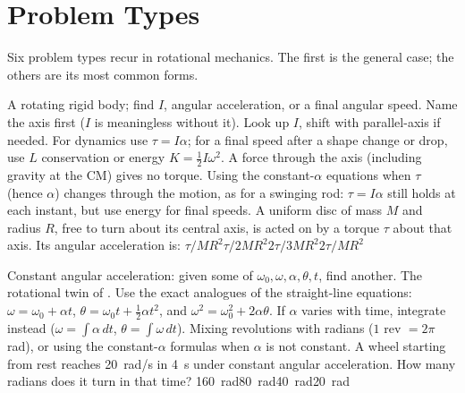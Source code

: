 \section{Problem Types}\label{sec:types14}
Six problem types recur in rotational mechanics. The first is the general case; the others are its most
common forms.

{A rotating rigid body; find $I$, angular acceleration, or a final angular speed.}
{Name the axis first ($I$ is meaningless without it). Look up $I$, shift with parallel-axis if needed.
For dynamics use $\tau=I\alpha$; for a final speed after a shape change or drop, use $L$ conservation or
energy $K=\tfrac{1}{2}I\omega^2$. A force through the axis (including gravity at the CM) gives no torque.}
{Using the constant-$\alpha$ equations when $\tau$ (hence $\alpha$) changes through the motion, as for a
swinging rod: $\tau=I\alpha$ still holds at each instant, but use energy for final speeds.}
{A uniform disc of mass $M$ and radius $R$, free to turn about its central axis, is acted on by a torque
$\tau$ about that axis. Its angular acceleration is:}
{$\tau/MR^2$}{$\tau/2MR^2$}{$2\tau/3MR^2$}{$2\tau/MR^2$}

{Constant angular acceleration: given some of $\omega_0,\omega,\alpha,\theta,t$, find another. The
rotational twin of .}
{Use the exact analogues of the straight-line equations: $\omega=\omega_0+\alpha t$,
$\theta=\omega_0 t+\tfrac{1}{2}\alpha t^2$, and $\omega^2=\omega_0^2+2\alpha\theta$. If $\alpha$ varies with
time, integrate instead ($\omega=\int\alpha\,dt$, $\theta=\int\omega\,dt$).}
{Mixing revolutions with radians ($1$ rev $=2\pi$ rad), or using the constant-$\alpha$ formulas when
$\alpha$ is not constant.}
{A wheel starting from rest reaches \SI{20}{rad/s} in \SI{4}{s} under constant angular acceleration. How
many radians does it turn in that time?}
{\SI{160}{rad}}{\SI{80}{rad}}{\SI{40}{rad}}{\SI{20}{rad}}

